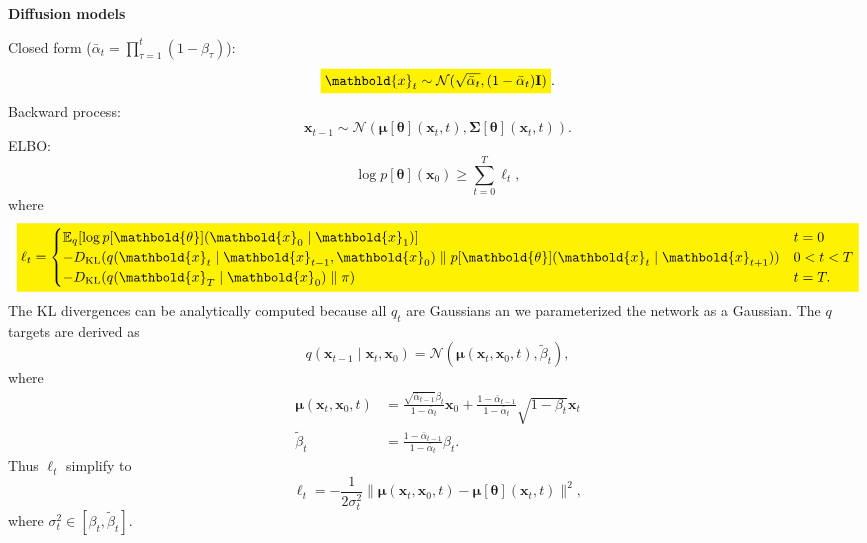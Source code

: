 \documentclass[10pt]{article}
\newenvironment{topic}[1]
{\textbf{\sffamily \footnotesize \colorbox{black}{\rlap{\textbf{\textcolor{white}{#1}}}\hspace{\linewidth}\hspace{-2\fboxsep}}}}
{}
\newenvironment{subtopic}[1]
{\begin{center}\textbf{\footnotesize \sffamily #1}\end{center}}
{}
\renewcommand{\mat}[1]{\ensuremath{\mathbf{#1}}}
\renewcommand{\vec}[1]{\ensuremath{\mathbold{#1}}}
\begin{document}
\begin{multicols*}{3}
\begin{topic}{Generative models}
\begin{subtopic}{Diffusion models}
            Closed form ($\bar{\alpha}_t = \prod_{\tau=1}^t (1-\beta_{\tau})$): \[
                \colorbox{yellow}{$\displaystyle \vec{x}_t \sim \mathcal{N}(\sqrt{\bar{\alpha}_t}, (1-\bar{\alpha}_t) \mat{I})$}.
            \]
            Backward process: \[
                \vec{x}_{t-1} \sim \mathcal{N}(\vec{\mu}[\vec{\theta}](\vec{x}_t, t), \mat{\Sigma}[\vec{\theta}](\vec{x}_t, t)).
            \]
            ELBO: \[
                \log p[\vec{\theta}](\vec{x}_0) \geq \sum_{t=0}^{T} \ell_t,
            \]
            where \[
                \colorbox{yellow}{$\displaystyle \ell_t = \begin{cases}
                    \E_q[\log p[\vec{\theta}](\vec{x}_0 \mid \vec{x}_1)]                                                          & t = 0     \\
                    -D_{\mathrm{KL}}(q(\vec{x}_t \mid \vec{x}_{t-1}, \vec{x}_0) \;\|\; p[\vec{\theta}](\vec{x}_t \mid \vec{x}_{t+1})) & 0 < t < T \\
                    -D_{\mathrm{KL}}(q(\vec{x}_T \mid \vec{x}_0) \;\|\; \pi)                                                          & t = T.
                \end{cases}$}
            \]
            The KL divergences can be analytically computed because all $q_t$ are Gaussians an we parameterized
            the network as a Gaussian. The $q$ targets are derived as \[
                q(\vec{x}_{t-1} \mid \vec{x}_t, \vec{x}_0) = \mathcal{N}(\vec{\mu}(\vec{x}_t, \vec{x}_0, t), \tilde{\beta}_t),
            \]
            where
            \begin{align*}
                \vec{\mu}(\vec{x}_t, \vec{x}_0, t) & = \frac{\sqrt{\bar{\alpha}_{t-1}} \beta_t}{1-\bar{\alpha}_t} \vec{x}_0 + \frac{1-\bar{\alpha}_{t-1}}{1-\bar{\alpha}_t} \sqrt{1-\beta_t} \vec{x}_t \\
                \tilde{\beta}_t                    & = \frac{1-\bar{\alpha}_{t-1}}{1-\bar{\alpha}_t} \beta_t.
            \end{align*}
            Thus $\ell_t$ simplify to \[
                \ell_t = -\frac{1}{2 \sigma_t^2} \| \vec{\mu}(\vec{x}_t, \vec{x}_0, t) - \vec{\mu}[\vec{\theta}](\vec{x}_t,t) \|^2,
            \]
            where $\sigma_t^2 \in [\beta_t, \tilde{\beta}_t]$.


\end{subtopic}
\end{topic}
\end{multicols*}
\end{document}
